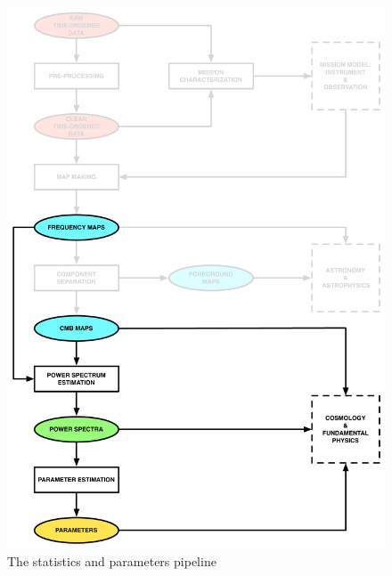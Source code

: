 \begin{figure}[htbp]
\centering
\includegraphics[width=1\textwidth]{sp}
\caption{The statistics and parameters pipeline}
\label{default}

\end{figure}


%



